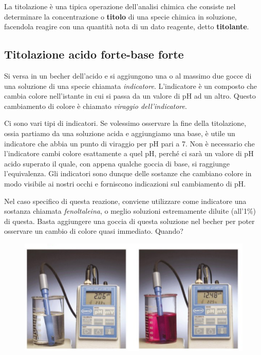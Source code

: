 La titolazione è una tipica operazione dell'analisi chimica che consiste nel determinare la concentrazione o \textbf{titolo} di una specie chimica in soluzione, facendola reagire con una quantità nota di un dato reagente, detto \textbf{titolante}.
\subsection{Titolazione acido forte-base forte}
Si versa in un becher dell'acido e si aggiungono una o al massimo due gocce di una soluzione di una specie chiamata \textit{indicatore}. L'indicatore è un composto che cambia colore nell'istante in cui si passa da un valore di pH ad un altro. Questo cambiamento di colore è chiamato \textit{viraggio dell'indicatore}.

Ci sono vari tipi di indicatori. Se volessimo osservare la fine della titolazione, ossia partiamo da una soluzione acida e aggiungiamo una base, è utile un indicatore che abbia un punto di viraggio per pH pari a 7. Non è necessario che l'indicatore cambi colore esattamente a quel pH, perché ci sarà un valore di pH acido superato il quale, con appena qualche goccia di base, si raggiunge l'equivalenza. Gli indicatori sono dunque delle sostanze che cambiano colore in modo visibile ai nostri occhi e forniscono indicazioni sul cambiamento di pH.

Nel caso specifico di questa reazione, conviene utilizzare come indicatore una sostanza chiamata \textit{fenoltaleina}, o meglio soluzioni estremamente diluite (all'1\%) di questa. Basta aggiungere una goccia di questa soluzione nel becher per poter osservare un cambio di colore quasi immediato. Quando?

\begin{figure}[H]
    \centering
    \includegraphics[width=14cm]{immagini/Fenoltaleina.png}
\end{figure}

